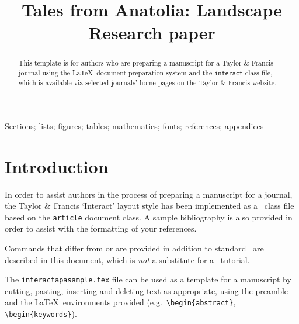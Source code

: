 \documentclass[]{interact}
\theoremstyle{plain}%
\theoremstyle{definition}
\theoremstyle{remark}
\begin{document}

\title{Tales from Anatolia: Landscape Research paper}

\author{
}

\maketitle

\begin{abstract}
This template is for authors who are preparing a manuscript for a Taylor \& Francis journal using the \LaTeX\ document preparation system and the \texttt{interact} class file, which is available via selected journals' home pages on the Taylor \& Francis website.
\end{abstract}

\begin{keywords}
Sections; lists; figures; tables; mathematics; fonts; references; appendices
\end{keywords}


\section{Introduction}

In order to assist authors in the process of preparing a manuscript for a journal, the Taylor \& Francis `\textsf{Interact}' layout style has been implemented as a \LaTeXe\ class file based on the \texttt{article} document class. A sample bibliography is also provided in order to assist with the formatting of your references.

Commands that differ from or are provided in addition to standard \LaTeXe\ are described in this document, which is \emph{not} a substitute for a \LaTeXe\ tutorial.

The \texttt{interactapasample.tex} file can be used as a template for a manuscript by cutting, pasting, inserting and deleting text as appropriate, using the preamble and the \LaTeX\ environments provided (e.g.\ \verb"\begin{abstract}", \verb"\begin{keywords}").
\end{document}
